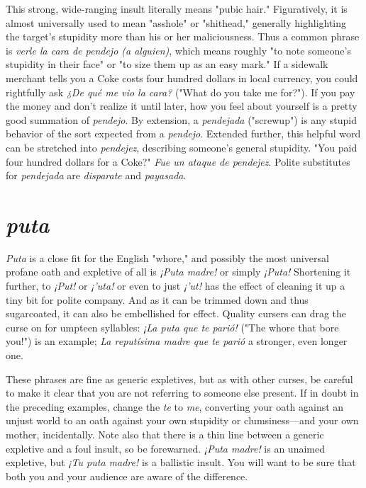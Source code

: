 This strong, wide-ranging insult literally means "pubic hair."
Figuratively, it is almost universally used to mean "asshole" or "shithead," generally highlighting the target's stupidity more than his or
her maliciousness. Thus a common phrase is \emph{verle la cara de pendejo
(a alguien)}, which means roughly "to note someone's stupidity in their
face" or "to size them up as an easy mark." If a sidewalk merchant
tells you a Coke costs four hundred dollars in local currency, you could
rightfully ask \emph{¿De qué me vio la cara?} ("What do you take me for?"). If
you pay the money and don't realize it until later, how you feel about
yourself is a pretty good summation of \emph{pendejo}. By extension, a \emph{pendejada} ("screwup") is any stupid behavior of the sort expected from a
\emph{pendejo}. Extended further, this helpful word can be stretched into \emph{pendejez}, describing someone's general stupidity. "You paid four hundred
dollars for a Coke?" \emph{Fue un ataque de pendejez}. Polite substitutes for
\emph{pendejada} are \emph{disparate} and \emph{payasada}.

\section{\emph{puta}}

\emph{Puta} is a close fit for the English "whore," and possibly the
most universal profane oath and expletive of all is \emph{¡Puta madre!} or
simply \emph{¡Puta!} Shortening it further, to \emph{¡Put!} or \emph{¡'uta!} or even to just
\emph{¡'ut!} has the effect of cleaning it up a tiny bit for polite company. And
as it can be trimmed down and thus sugarcoated, it can also be embellished for effect. Quality cursers can drag the curse on for umpteen syllables: \emph{¡La puta que te parió!} ("The whore that bore you!") is an example; \emph{La reputísima madre que te parió} a stronger, even longer one.

These phrases are fine as generic expletives, but as with other
curses, be careful to make it clear that you are not referring to someone else present. If in doubt in the preceding examples, change the \emph{te}
to \emph{me}, converting your oath against an unjust world to an oath against
your own stupidity or clumsiness---and your own mother, incidentally.
Note also that there is a thin line between a generic expletive and a
foul insult, so be forewarned. \emph{¡Puta madre!} is an unaimed expletive,
but \emph{¡Tu puta madre!} is a ballistic insult. You will want to be sure that
both you and your audience are aware of the difference.

